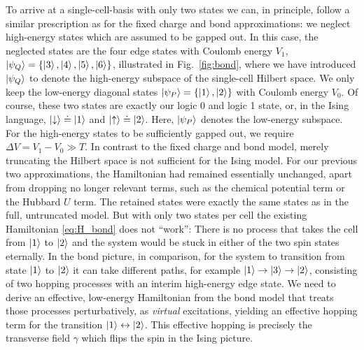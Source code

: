 To arrive at a single-cell-basis with only two states we can, in principle,
follow a similar prescription as for the fixed charge and bond approximations:
we neglect high-energy states which are assumed to be gapped out. In this case,
the neglected states are the four edge states with Coulomb energy $V_1$,
$\left|\psi_Q\right> = \left\{ \left|3\right>, \left|4\right>, \left|5\right>, \left|6\right> \right\}$,
illustrated in Fig.~\ref{fig:bond}, where we have introduced $\left|\psi_Q\right>$ to
denote the high-energy subspace of the single-cell Hilbert space. We only keep
the low-energy diagonal states $\left|\psi_P\right> = \left\{ \left|1\right>, \left|2\right>
\right\}$ with Coulomb energy $V_0$. Of course, these two states are exactly our
logic 0 and logic 1 state, or, in the Ising language, $\left|\downarrow\right> \doteq
\left|1\right>$ and $\left|\uparrow\right> \doteq \left|2\right>$. Here, $\left|\psi_P\right>$ denotes the
low-energy subspace. For the high-energy states to be sufficiently gapped out,
we require $\Delta V = V_1 - V_0 \gg T$. In contrast to the fixed charge and
bond model, merely truncating the Hilbert space is not sufficient for the Ising
model. For our previous two approximations, the Hamiltonian had remained
essentially unchanged, apart from dropping no longer relevant terms, such as the
chemical potential term or the Hubbard $U$ term. The retained states were
exactly the same states as in the full, untruncated model. But with only two
states per cell the existing Hamiltonian \eqref{eq:H_bond} does not ``work'':
There is no process that takes the cell from $\left|1\right>$ to $\left|2\right>$ and the
system would be stuck in either of the two spin states eternally. In the bond
picture, in comparison, for the system to transition from state $\left|1\right>$ to
$\left|2\right>$ it can take different paths, for example $\left|1\right> \rightarrow \left|3\right>
\rightarrow \left|2\right>$, consisting of two hopping processes with an interim
high-energy edge state. We need to derive an effective, low-energy Hamiltonian
from the bond model that treats those processes perturbatively, as
\emph{virtual} excitations, yielding an effective hopping term for the
transition $\left|1\right> \leftrightarrow \left|2\right>$. This effective hopping is
precisely the transverse field $\gamma$ which flips the spin in the Ising
picture.

